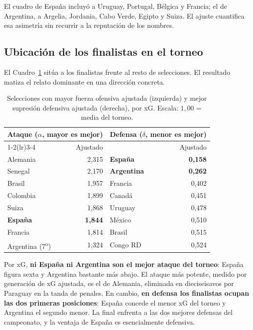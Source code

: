 \documentclass[11pt,a4paper]{article}
\begin{document}
El cuadro de España incluyó a Uruguay, Portugal, Bélgica y Francia; el de Argentina, a Argelia, Jordania, Cabo Verde, Egipto y Suiza. El ajuste cuantifica esa asimetría sin recurrir a la reputación de los nombres.

\subsection{Ubicación de los finalistas en el torneo}

El Cuadro~\ref{tab:ranking} sitúa a los finalistas frente al resto de selecciones. El resultado matiza el relato dominante en una dirección concreta.

\begin{table}[htbp]
\centering
\caption{Selecciones con mayor fuerza ofensiva ajustada (izquierda) y mejor supresión defensiva ajustada (derecha), por xG. Escala: $1{,}00$ = media del torneo.}
\label{tab:ranking}
\begin{tabular}{lr@{\hskip 1.5cm}lr}
\toprule
\multicolumn{2}{c}{\textbf{Ataque} ($\alpha$, mayor es mejor)} & \multicolumn{2}{c}{\textbf{Defensa} ($\delta$, menor es mejor)} \\
\cmidrule(lr){1-2}\cmidrule(lr){3-4}
& Ajustado & & Ajustado \\
\midrule
Alemania    & 2{,}315 & \textbf{España}    & \textbf{0{,}158} \\
Senegal     & 2{,}170 & \textbf{Argentina} & \textbf{0{,}262} \\
Brasil      & 1{,}957 & Francia            & 0{,}402 \\
Colombia    & 1{,}899 & Canadá             & 0{,}451 \\
Suiza       & 1{,}868 & Uruguay            & 0{,}478 \\
\textbf{España} & \textbf{1{,}844} & México       & 0{,}510 \\
Francia     & 1{,}814 & Brasil             & 0{,}515 \\
Argentina (7\textsuperscript{o}) & 1{,}324 & Congo RD & 0{,}524 \\
\bottomrule
\end{tabular}
\end{table}

Por xG, \textbf{ni España ni Argentina son el mejor ataque del torneo}: España figura sexta y Argentina bastante más abajo. El ataque más potente, medido por generación de xG ajustada, es el de Alemania, eliminada en dieciseisavos por Paraguay en la tanda de penales. En cambio, \textbf{en defensa los finalistas ocupan las dos primeras posiciones}: España concede el menor xG del torneo y Argentina el segundo menor. La final enfrenta a las dos mejores defensas del campeonato, y la ventaja de España es esencialmente defensiva.
\end{document}
